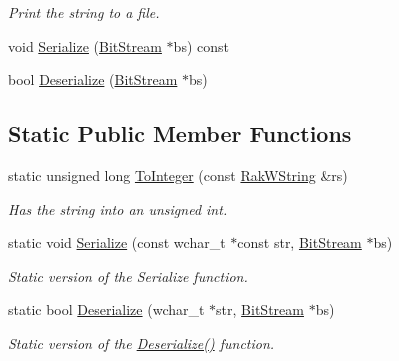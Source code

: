 \begin{DoxyCompactItemize}
\begin{DoxyCompactList}\small\item\em Print the string to a file. \end{DoxyCompactList}\item 
void \hyperlink{class_rak_net_1_1_rak_w_string_a97e242c753c7e6096465b48db89a2aeb}{Serialize} (\hyperlink{class_rak_net_1_1_bit_stream}{Bit\-Stream} $\ast$bs) const 
\item 
bool \hyperlink{class_rak_net_1_1_rak_w_string_a73ce137cd6ac8f89e437b35c652e7f9d}{Deserialize} (\hyperlink{class_rak_net_1_1_bit_stream}{Bit\-Stream} $\ast$bs)
\end{DoxyCompactItemize}
\subsection*{Static Public Member Functions}
\begin{DoxyCompactItemize}
\item 
\hypertarget{class_rak_net_1_1_rak_w_string_a526a80d9314d47b1e366dd59c1cb9efe}{static unsigned long \hyperlink{class_rak_net_1_1_rak_w_string_a526a80d9314d47b1e366dd59c1cb9efe}{To\-Integer} (const \hyperlink{class_rak_net_1_1_rak_w_string}{Rak\-W\-String} \&rs)}\label{class_rak_net_1_1_rak_w_string_a526a80d9314d47b1e366dd59c1cb9efe}

\begin{DoxyCompactList}\small\item\em Has the string into an unsigned int. \end{DoxyCompactList}\item 
\hypertarget{class_rak_net_1_1_rak_w_string_ad20c0c634c9eb670b0cc0e27e7530c73}{static void \hyperlink{class_rak_net_1_1_rak_w_string_ad20c0c634c9eb670b0cc0e27e7530c73}{Serialize} (const wchar\-\_\-t $\ast$const str, \hyperlink{class_rak_net_1_1_bit_stream}{Bit\-Stream} $\ast$bs)}\label{class_rak_net_1_1_rak_w_string_ad20c0c634c9eb670b0cc0e27e7530c73}

\begin{DoxyCompactList}\small\item\em Static version of the Serialize function. \end{DoxyCompactList}\item 
\hypertarget{class_rak_net_1_1_rak_w_string_a87a7abb037cce6533c5c0a30b7f9dd67}{static bool \hyperlink{class_rak_net_1_1_rak_w_string_a87a7abb037cce6533c5c0a30b7f9dd67}{Deserialize} (wchar\-\_\-t $\ast$str, \hyperlink{class_rak_net_1_1_bit_stream}{Bit\-Stream} $\ast$bs)}\label{class_rak_net_1_1_rak_w_string_a87a7abb037cce6533c5c0a30b7f9dd67}

\begin{DoxyCompactList}\small\item\em Static version of the \hyperlink{class_rak_net_1_1_rak_w_string_a73ce137cd6ac8f89e437b35c652e7f9d}{Deserialize()} function. \end{DoxyCompactList}\end{DoxyCompactItemize}
